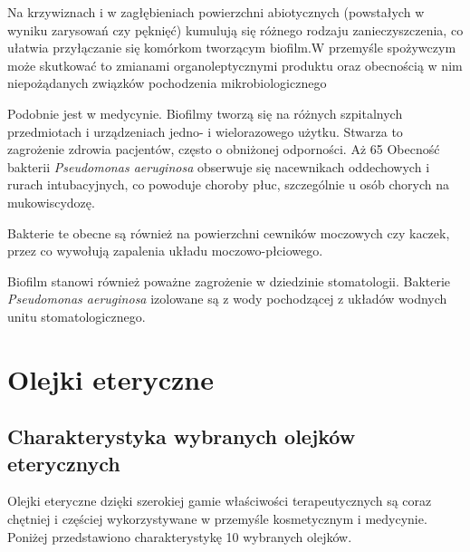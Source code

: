 \documentclass[11pt,a4paper]{report}
\begin{document}
Na krzywiznach i w zagłębieniach powierzchni abiotycznych (powstałych w wyniku zarysowań czy pęknięć) kumulują się różnego rodzaju zanieczyszczenia, co ułatwia przyłączanie się komórkom tworzącym biofilm.W przemyśle spożywczym może skutkować to zmianami organoleptycznymi produktu oraz obecnością w nim niepożądanych związków pochodzenia mikrobiologicznego\cite{usuwanie}

 
Podobnie jest w medycynie. Biofilmy tworzą się na różnych szpitalnych przedmiotach i urządzeniach jedno- i wielorazowego użytku. Stwarza to zagrożenie zdrowia pacjentów, często o obniżonej odporności.
Aż 65%
Obecność bakterii \textit{Pseudomonas aeruginosa} obserwuje się nacewnikach oddechowych i rurach intubacyjnych, co powoduje choroby płuc, szczególnie u osób chorych na mukowiscydozę.
\cite{mukowiscydoza}
 
 
Bakterie te obecne są również na powierzchni cewników moczowych czy kaczek, przez co wywołują zapalenia układu moczowo-płciowego\cite{moczowy}.
 
 
Biofilm stanowi również poważne zagrożenie w dziedzinie stomatologii. Bakterie \textit{Pseudomonas aeruginosa} izolowane są z wody pochodzącej z układów wodnych unitu stomatologicznego\cite{bzdega}.
 


\section{Olejki eteryczne}

\subsection{Charakterystyka wybranych olejków eterycznych}
Olejki eteryczne dzięki szerokiej gamie właściwości terapeutycznych są coraz chętniej i częściej wykorzystywane w przemyśle kosmetycznym i medycynie. Poniżej przedstawiono charakterystykę 10 wybranych olejków.
\end{document}
